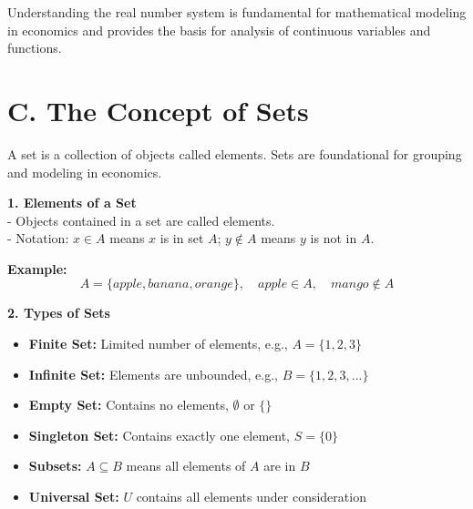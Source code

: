 \begin{tcolorbox}[sectionbox]

Understanding the real number system is fundamental for mathematical modeling in economics and provides the basis for analysis of continuous variables and functions.
\end{tcolorbox}



\section*{C. The Concept of Sets}
\begin{tcolorbox}[sectionbox]
A set is a collection of objects called elements. Sets are foundational for grouping and modeling in economics.
\end{tcolorbox}


\begin{tcolorbox}[sectionbox]
\textbf{1. Elements of a Set}\\
- Objects contained in a set are called elements.\\
- Notation: $x \in A$ means $x$ is in set $A$; $y \notin A$ means $y$ is not in $A$.
\end{tcolorbox}

\begin{tcolorbox}[examplebox]
\textbf{Example:} 
\[
A = \{apple, banana, orange\}, \quad apple \in A, \quad mango \notin A
\]
\end{tcolorbox}

\begin{tcolorbox}[sectionbox]
\textbf{2. Types of Sets}
\begin{itemize}
    \item \textbf{Finite Set:} Limited number of elements, e.g., $A=\{1,2,3\}$
    \item \textbf{Infinite Set:} Elements are unbounded, e.g., $B=\{1,2,3,\dots\}$
    \item \textbf{Empty Set:} Contains no elements, $\emptyset$ or $\{\}$
    \item \textbf{Singleton Set:} Contains exactly one element, $S=\{0\}$
    \item \textbf{Subsets:} $A \subseteq B$ means all elements of $A$ are in $B$
    \item \textbf{Universal Set:} $U$ contains all elements under consideration
\end{itemize}
\end{tcolorbox}

